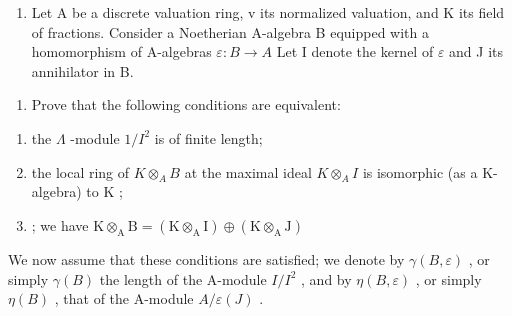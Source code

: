 \begin{enumerate}
\def\labelenumi{\arabic{enumi})}
\setcounter{enumi}{9}
\tightlist
\item
  Let A be a discrete valuation ring, v its normalized valuation, and K its field of fractions. Consider a Noetherian A-algebra B equipped with a homomorphism of A-algebras \(\varepsilon:B\to A\) Let I denote the kernel of \(\varepsilon\) and J its annihilator in B.
\end{enumerate}

\begin{enumerate}
\def\labelenumi{\alph{enumi})}
\tightlist
\item
  Prove that the following conditions are equivalent:
\end{enumerate}

\begin{enumerate}
\def\labelenumi{(\roman{enumi})}
\item
  the \(\Lambda\) -module \(1 / I^2\) is of finite length;
\item
  the local ring of \(K \otimes_{A} B\) at the maximal ideal \(K \otimes_{A} I\) is isomorphic (as a K-algebra) to K ;
\item
  ; we have \(\mathrm{K}\otimes_{\mathrm{A}}\mathrm{B} = (\mathrm{K}\otimes_{\mathrm{A}}\mathrm{I})\oplus (\mathrm{K}\otimes_{\mathrm{A}}\mathrm{J})\)
\end{enumerate}

We now assume that these conditions are satisfied; we denote by \(\gamma(B, \varepsilon)\) , or simply \(\gamma(B)\) the length of the A-module \(I/I^{2}\) , and by \(\eta(B, \varepsilon)\) , or simply \(\eta(B)\) , that of the A-module \(A/\varepsilon(J)\) .

